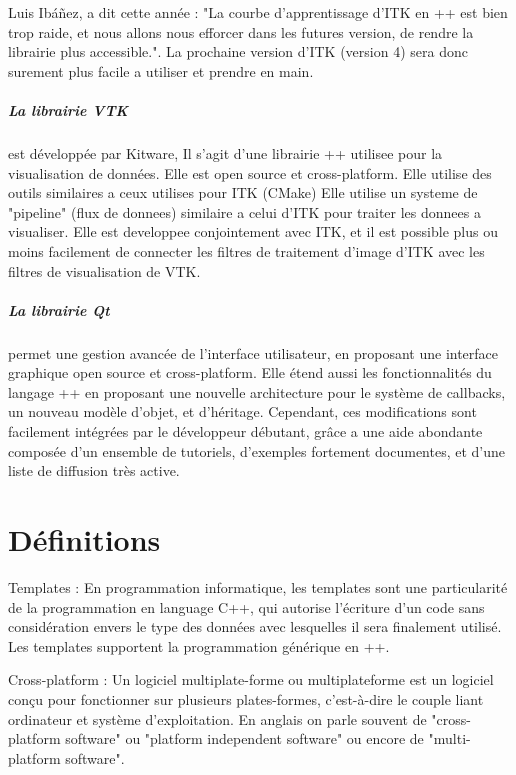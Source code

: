 Luis Ibáñez, a dit cette année : "La courbe d'apprentissage d'ITK en \C++ est bien trop raide, et nous allons nous efforcer dans les futures version, de rendre la librairie plus accessible.". La prochaine version d'ITK (version 4) sera donc surement plus facile a utiliser et prendre en main.

\paragraph{La librairie VTK} est développée par Kitware, Il s'agit d'une librairie \C++ utilisee pour la visualisation de données. Elle est open source et cross-platform. Elle utilise des outils similaires a ceux utilises pour ITK (CMake)
Elle utilise un systeme de "pipeline" (flux de donnees) similaire a celui d'ITK pour traiter les donnees a visualiser. Elle est developpee conjointement avec ITK, et il est possible plus ou moins facilement de connecter les filtres de traitement d'image d'ITK avec les filtres de visualisation de VTK.

\paragraph{La librairie Qt} permet une gestion avancée de l'interface utilisateur, en proposant une interface graphique open source et cross-platform.
Elle étend aussi les fonctionnalités du langage \C++ en proposant une nouvelle architecture pour le système de callbacks, un nouveau modèle d'objet, et d'héritage. Cependant, ces modifications sont facilement intégrées par le développeur débutant, grâce a une aide abondante composée d'un ensemble de tutoriels, d'exemples fortement documentes, et d'une liste de diffusion très active.







\chapter{Définitions}


Templates : En programmation informatique, les templates sont une particularité de la programmation en language C++, qui autorise l'écriture d'un code sans considération envers le type des données avec lesquelles il sera finalement utilisé. Les templates supportent la programmation générique en {\C++}.

Cross-platform : Un logiciel multiplate-forme ou multiplateforme est un logiciel conçu pour fonctionner sur plusieurs plates-formes, c’est-à-dire le couple liant ordinateur et système d’exploitation. En anglais on parle souvent de "cross-platform software" ou "platform independent software" ou encore de "multi-platform software".

